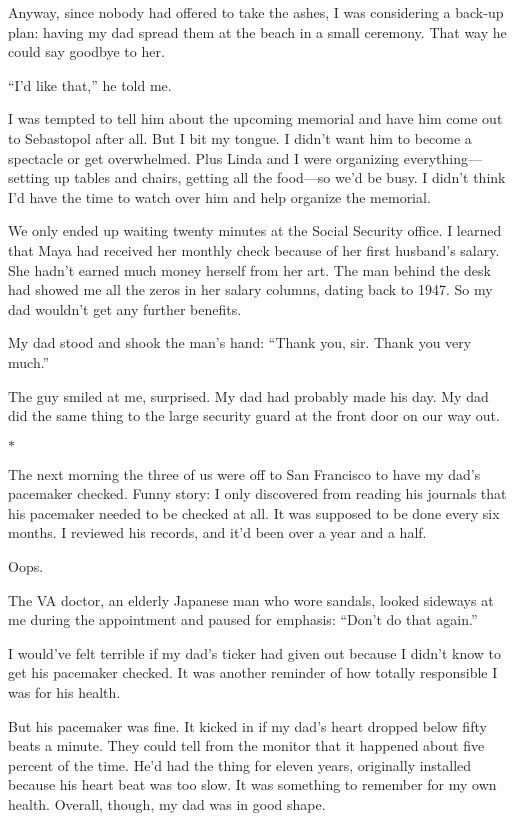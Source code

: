 \documentclass[12pt]{book}
\begin{document}
Anyway, since nobody had offered to take the ashes, I was considering a back-up plan: having my dad spread them at the beach in a small ceremony. That way he could say goodbye to her.

``I'd like that,'' he told me.

I was tempted to tell him about the upcoming memorial and have him come out to Sebastopol after all. But I bit my tongue. I didn't want him to become a spectacle or get overwhelmed. Plus Linda and I were organizing everything---setting up tables and chairs, getting all the food---so we'd be busy. I didn't think I'd have the time to watch over him and help organize the memorial.

We only ended up waiting twenty minutes at the Social Security office. I learned that Maya had received her monthly check because of her first husband's salary. She hadn't earned much money herself from her art. The man behind the desk had showed me all the zeros in her salary columns, dating back to 1947. So my dad wouldn't get any further benefits.

My dad stood and shook the man's hand: ``Thank you, sir. Thank you very much.''

The guy smiled at me, surprised. My dad had probably made his day. My dad did the same thing to the large security guard at the front door on our way out.

\begin{center}$*$\end{center}

The next morning the three of us were off to San Francisco to have my dad's pacemaker checked. Funny story: I only discovered from reading his journals that his pacemaker needed to be checked at all. It was supposed to be done every six months. I reviewed his records, and it'd been over a year and a half.

Oops.

The VA doctor, an elderly Japanese man who wore sandals, looked sideways at me during the appointment and paused for emphasis: ``Don't do that again.''

I would've felt terrible if my dad's ticker had given out because I didn't know to get his pacemaker checked. It was another reminder of how totally responsible I was for his health.

But his pacemaker was fine. It kicked in if my dad's heart dropped below fifty beats a minute. They could tell from the monitor that it happened about five percent of the time. He'd had the thing for eleven years, originally installed because his heart beat was too slow. It was something to remember for my own health. Overall, though, my dad was in good shape.
\end{document}
